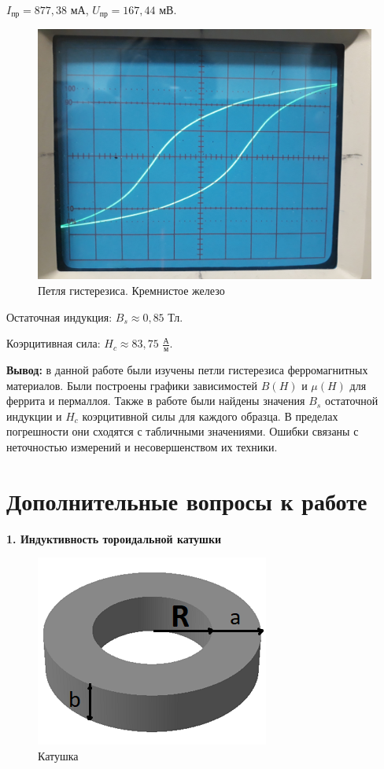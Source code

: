 \documentclass[a4paper,12pt]{article} %
\begin{document}
$I_{\text{пр}} = 877,38$ мА, $U_{\text{пр}} = 167,44$ мВ.
\newpage
\begin{figure}[h!]
	\centering
	\includegraphics[scale=0.18]{Pictures/КРМЖЛЗ_ПЕТЛЯ.jpg}
	\caption{Петля гистерезиса. Кремнистое железо}
\end{figure}

\vspace{5mm}
Остаточная индукция: $B_s \approx 0,85$ Тл.

\vspace{5mm}
Коэрцитивная сила: $H_c \approx 83,75$ $\frac{\text{А}}{\text{м}}$. 



\newpage

\textbf{Вывод:} в данной работе были изучены петли гистерезиса ферромагнитных материалов. Были построены графики зависимостей $B(H)$ и $\mu (H)$ для феррита и пермаллоя. Также в работе были найдены значения $B_s$ остаточной индукции и $H_c$ коэрцитивной силы для каждого образца. В пределах погрешности они сходятся с табличными значениями. Ошибки связаны с неточностью измерений и несовершенством их техники.


\newpage
\section*{Дополнительные вопросы к работе}
\textbf{{\large 1. Индуктивность тороидальной катушки}}

\begin{figure}[h!]
	\centering
	\includegraphics[scale=1.2]{Pictures/Катушка.png}
	\caption{Катушка}
\end{figure}
\end{document}
